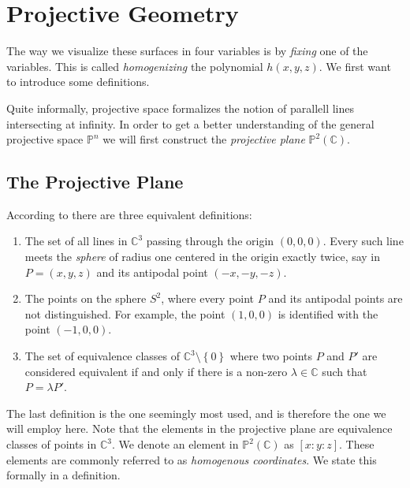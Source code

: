 \documentclass[a4paper]{article}
\theoremstyle{definition}
\newcommand{\C}{\ensuremath{\mathbb{C}}}
\newcommand{\proj}{\ensuremath{\mathbb{P}}}
\begin{document}
    \section{Projective Geometry}
    \label{sec:projective_geometry}
    
    The way we visualize these surfaces in four variables is by \emph{fixing}
    one of the variables. This is called \emph{homogenizing} the polynomial
    $h(x, y, z)$. We first want to introduce some definitions.

    Quite informally, projective space formalizes the notion of parallell lines
    intersecting at infinity. In order to get a better understanding of the
    general projective space $\proj^n$ we will first construct the
    \emph{projective plane} $\proj^2(\C)$.

    \subsection{The Projective Plane}
    \label{sub:the_projective_plane}
    
    According to \cite{Wik16} there are three equivalent definitions:
    \begin{enumerate}
        \item The set of all lines in $\C^3$ passing through the origin $(0, 0,
            0)$. Every such line meets the \emph{sphere} of radius one centered
            in the origin exactly twice, say in $P = (x, y, z)$ and its
            antipodal point $(-x, -y, -z)$.

        \item\label{item:sphere} The points on the sphere $S^2$, where every point $P$ and its
            antipodal points are not distinguished. For example, the point $(1,
            0, 0)$ is identified with the point $(-1, 0, 0)$.

        \item The set of equivalence classes of $\C^3 \setminus \left\{ 0
            \right\}$ where two points $P$ and $P'$ are considered equivalent
            if and only if there is a non-zero $\lambda \in \C$ such that $P =
            \lambda P'$.
    \end{enumerate}

    The last definition is the one seemingly most used, and is therefore the
    one we will employ here. Note that the elements in the projective plane are
    equivalence classes of points in $\C^3$. We denote an element in
    $\proj^2(\C)$ as $\left[ x : y : z \right]$. These elements are commonly
    referred to as \emph{homogenous coordinates}. We state this formally in a
    definition.
\end{document}
